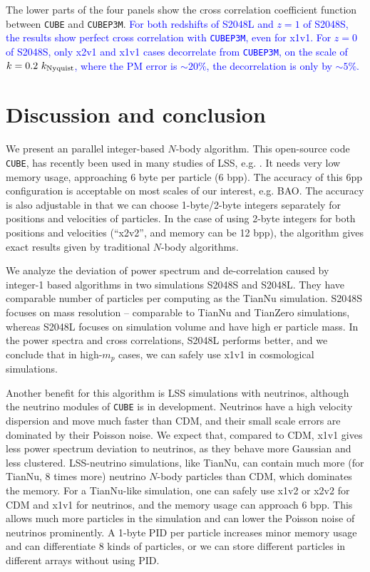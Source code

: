 \documentclass[10pt,twocolumn,preprint]{emulateapj}
\newcommand{\tcb}{\textcolor{blue}}
\begin{document}
The lower parts of the four panels show the cross correlation coefficient function between {\tt CUBE} and {\tt CUBEP3M}. \tcb{For both redshifts of S2048L and $z=1$ of S2048S, the results show perfect cross correlation with {\tt CUBEP3M}, even for x1v1. For $z=0$ of S2048S, only x2v1 and x1v1 cases decorrelate from {\tt CUBEP3M}, on the scale of $k=0.2\ k_{\rm Nyquist}$, where the PM error is $\sim 20\%$, the decorrelation is only by $\sim 5\%$.}


\section{Discussion and conclusion}\label{s.discussion}
We present an parallel integer-based $N$-body algorithm. This open-source code {\tt CUBE}, has recently been used in many studies of LSS, e.g. \cite{2017PhRvD..95d3501Y,2017ApJ...841L..29W,2017MNRAS.469.1968P}. It needs very low memory usage, approaching 6 byte per particle (6 bpp). The accuracy of this 6pp configuration is acceptable on most scales of our interest, e.g. BAO. The accuracy is also adjustable in that we can choose 1-byte/2-byte integers separately for positions and velocities of particles. In the case of using 2-byte integers for both positions and velocities (``x2v2'', and memory can be 12 bpp), the algorithm gives exact results given by traditional $N$-body algorithms.

We analyze the deviation of power spectrum and de-correlation caused by integer-1 based algorithms in two simulations S2048S and S2048L. They have comparable number of particles per computing as the TianNu simulation. S2048S focuses on mass resolution -- comparable to TianNu and TianZero simulations, whereas S2048L focuses on simulation volume and have high
er particle mass. In the power spectra and cross correlations, S2048L performs better, and we conclude that in high-$m_p$ cases, we can safely use x1v1 in cosmological simulations.

Another benefit for this algorithm is LSS simulations with neutrinos, although the neutrino modules of {\tt CUBE} is in development. Neutrinos have a high velocity dispersion and move much faster than CDM, and their small scale errors are dominated by their Poisson noise. We expect that, compared to CDM, x1v1 gives less power spectrum deviation to neutrinos, as they behave more Gaussian and less clustered. LSS-neutrino simulations, like TianNu, can contain much more (for TianNu, 8 times more) neutrino $N$-body particles than CDM, which dominates the memory. For a TianNu-like simulation, one can safely use x1v2 or x2v2 for CDM and x1v1 for neutrinos, and the memory usage can approach 6 bpp. This allows much more particles in the simulation and can lower the Poisson noise of neutrinos prominently. A 1-byte PID per particle increases minor memory usage and can differentiate 8 kinds of particles, or we can store different particles in different arrays without using PID.
\end{document}
